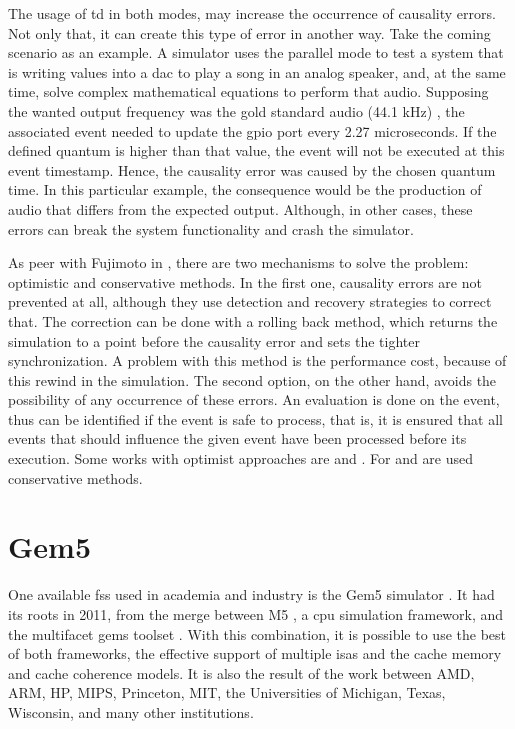 The usage of \gls{td} in both modes, may increase the occurrence of causality errors. Not only that, it can create this type of error in 
another way. Take the coming scenario as an example. A simulator uses the parallel mode to test a system that is writing values into a 
\gls{dac} to play a song in an analog speaker, and, at the same time, solve complex mathematical equations to perform that audio. Supposing 
the wanted output frequency was the gold standard audio (44.1 kHz) \cite{audio}, the associated event needed to update the \gls{gpio} port 
every 2.27 microseconds. If the defined quantum is higher than that value, the event will not be executed at this event timestamp. Hence, 
the causality error was caused by the chosen quantum time. In this particular example, the consequence would be the production of audio 
that differs from the expected output. Although, in other cases, these errors can break the system functionality and crash the simulator. 

As peer with Fujimoto in \cite{PDESfujimoto}, there are two mechanisms to solve the problem: optimistic and conservative methods. In the 
first one, causality errors are not prevented at all, although they use detection and recovery strategies to correct that. The correction can 
be done with a rolling back method, which returns the simulation to a point before the causality error and sets the tighter synchronization. 
A problem with this method is the performance cost, because of this rewind in the simulation. The second option, on the other hand, avoids the 
possibility of any occurrence of these errors. An evaluation is done on the event, thus can be identified if the event is safe to process, that 
is, it is ensured that all events that should influence the given event have been processed before its execution. Some works with optimist 
approaches are \cite{busnot2020standard} and \cite{optimist2}. For \cite{dist-gem5} and \cite{asynchronousSimulator} are used conservative methods.

\section{Gem5}

One available \gls{fss} used in academia and industry is the Gem5 simulator \cite{TheGem5Simulator}\cite{Thegem5simulatorV2}. It had its roots 
in 2011, from the merge between M5 \cite{TheM5Simulator}, a \gls{cpu} simulation framework, and the multifacet \gls{gems} toolset \cite{TheGEMS}. 
With this combination, it is possible to use the best of both frameworks, the effective support of multiple \glspl{isa} and the cache memory 
and cache coherence models. It is also the result of the work between AMD, ARM, HP, MIPS, Princeton, MIT, the Universities of Michigan, Texas, 
Wisconsin, and many other institutions.

